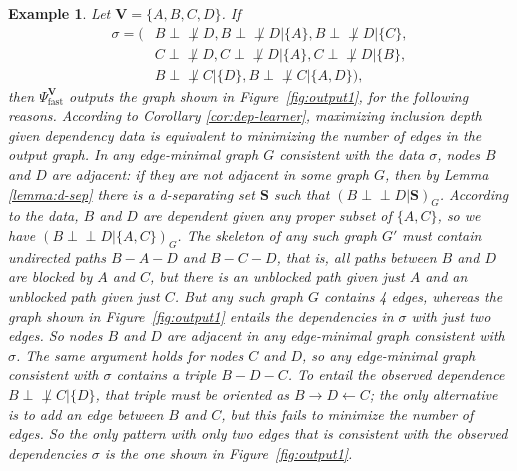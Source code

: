 \documentclass{elsarticle}%
\newtheorem{example}[theorem]{Example}
\newcommand{\set}[1]{\{#1\}}
\newcommand{\indep}{\ensuremath{\perp{}\!\!\!\!\!\!\!\perp{}}}
\newcommand{\dep}{\ensuremath{{\perp{}\!\!\!\!\!\!\!\not  \perp{}}}}
\renewcommand{\S}{\mathbf{{S}}}
\newcommand{\A}{A}
\newcommand{\B}{B}
\newcommand{\C}{C}
\newcommand{\G}{G}
\newcommand{\fast}{\mathrm{fast}}
\begin{document}
\begin{example}
  Let $\mathbf{V}=\set{A,B,C,D}$. If
  \begin{align*}
    \sigma = (&B\dep D, B\dep D|\set{A},  B\dep D|\set{C},\\
   & C\dep D, C\dep D|\set{A}, C\dep D|\set{B},\\
   &B\dep C|\set{D}, B\dep C|\set{A,D}), 
 \end{align*}
  then $\Psi_{\fast}^{\mathbf{V}}$ outputs the graph shown in Figure~\ref{fig:output1}, for the following reasons. According to Corollary \ref{cor:dep-learner}, maximizing inclusion depth given dependency data is equivalent to minimizing the number of edges in the output graph. In any edge-minimal graph $\G$ consistent with the data $\sigma$, nodes $\B$ and $D$ are adjacent: if they are not adjacent in some graph $\G$, then by Lemma \ref{lemma:d-sep} there is a d-separating set $\S$ such that $(\B \indep D|\S)_{G}$. According to the data, $\B$ and $D$ are dependent given any proper subset of $\{\A,\C\}$, so we have $(\B \indep D|\{\A,\C\})_{G}$. The skeleton of any such graph $\G'$ must contain undirected paths $\B - \A - D$ and $\B - \C - D$, that is, all paths between $\B$ and $D$ are blocked by $\A$ and $\C$, but there is an unblocked path given just $\A$ and an unblocked path given just $\C$. But any such graph $\G$ contains 4 edges, whereas the graph shown in Figure~\ref{fig:output1} entails the dependencies in $\sigma$ with just two edges. So nodes $\B$ and $D$ are adjacent in any edge-minimal graph consistent with $\sigma$. The same argument holds for nodes $\C$ and $D$, so any edge-minimal graph consistent with $\sigma$ contains a triple $\B-D-\C$. To entail the observed dependence $B\dep C|\set{D}$, that triple must be oriented as $\B \rightarrow D \leftarrow \C$; the only alternative is to add an edge between $\B$ and $\C$, but this fails to minimize the number of edges. So the only pattern with only two edges that is consistent with the observed dependencies $\sigma$ is the one shown in Figure~\ref{fig:output1}. 
  

\end{example}
\end{document}
